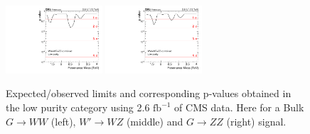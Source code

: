 \begin{figure}[h!]
\includegraphics[width=0.32\textwidth]{figures/analysis/search1/AN-15-211/pvalues/pvalue_WZinVVnew_low_purity.pdf}
\includegraphics[width=0.32\textwidth]{figures/analysis/search1/AN-15-211/pvalues/pvalue_BulkZZinVVnew_low_purity.pdf}
\caption{Expected/observed limits and corresponding p-values obtained in the low purity category using 2.6 $\textrm{fb}^{-1}$ of CMS data. Here for a Bulk $G\rightarrow WW$ (left), $W'\rightarrow WZ$ (middle) and $G\rightarrow ZZ$ (right) signal.}
\label{fig:searchI:Limits_LP}
\end{figure}

